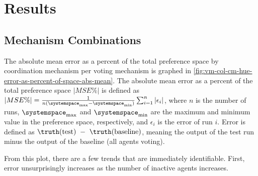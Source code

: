 \section{Results}\label{sec:results}

\subsection{Mechanism Combinations}\label{subsec:mechanism-combinations}
The absolute mean error as a percent of the total preference space by coordination
mechanism per voting mechanism is graphed in
\autoref{fig:vm-col-cm-hue-error-as-percent-of-space-abs-mean}.
The absolute mean error as a percent of the total preference space
$\lvert MSE\% \rvert$  is defined as
$
    \lvert MSE\% \rvert =
    \frac{1}{n (\systemspace_{\max} - \systemspace_{\min})}
        \sum^{n}_{i = 1}{\lvert \epsilon_i  \rvert}
$,
where $n$ is the number of runs, $\systemspace_{\max}$ and $\systemspace_{\min}$ are
the maximum and minimum value in the preference space, respectively, and $\epsilon_i$
is the error of run $i$.
Error is defined as $\truthof{\text{test}}~-~\truthof{\text{baseline}}$, meaning
the output of the test run minus the output of the baseline (all agents voting).

From this plot, there are a few trends that are immediately identifiable.
First, error unsurprisingly increases as the number of inactive agents increases.
%



